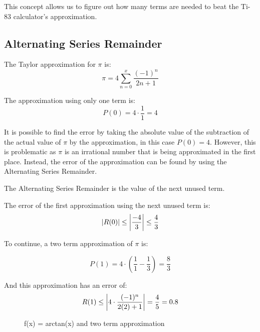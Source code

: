 \documentclass[12pt, titlepage]{article}
\begin{document}
This concept allows us to figure out how many terms are needed to beat the Ti-83 calculator's approximation.

\subsection{Alternating Series Remainder}
The Taylor approximation for \(\pi\) is:
\begin{equation*}
  \pi = 4\sum_{n=0}^{x}{ \frac{(-1)^n}{2n+1}}
\end{equation*}

The approximation using only one term is:
\begin{equation*}
  P(0) = 4 \cdot \frac{1}{1} = 4
\end{equation*}

It is possible to find the error by taking the absolute value of  the subtraction of the actual value of \(\pi\) by the approximation, in this case \(P(0) = 4\). However, this is problematic as \(\pi\) is an irrational number that is being approximated in the first place. Instead, the error of the approximation can be found by using the Alternating Series Remainder.

The Alternating Series Remainder is the value of the next unused term.

The error of the first approximation using the next unused term is:
\begin{equation*}
  \abs{R(0)} \leq \abs{\frac{-4}{3}} \leq \frac{4}{3}
\end{equation*}

To continue, a two term approximation of \(\pi\) is:

\begin{equation*}
  P(1) = 4 \cdot (\frac{1}{1} - \frac{1}{3}) = \frac{8}{3} 
\end{equation*}

And this approximation has an error of:
\begin{equation*}
  R(1) \leq  \abs{4 \cdot {\frac{(-1)^n}{2(2)+1}}} = \frac{4}{5} = 0.8
\end{equation*}

\begin{figure}[H]
\centering
    \caption[]{f(x) = arctan(x) and two term approximation}
\end{figure}
\end{document}
